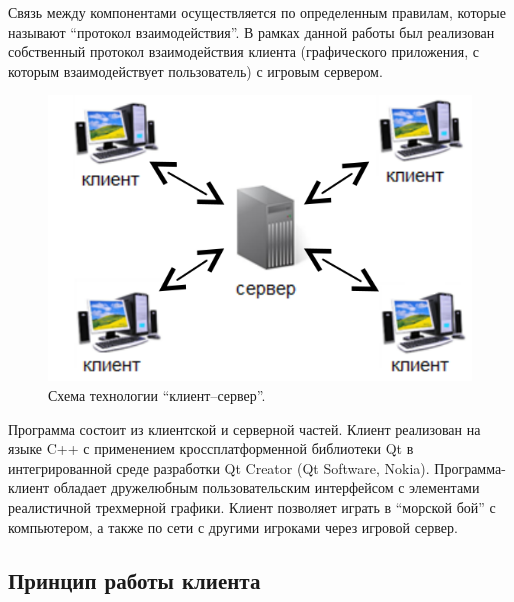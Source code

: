 \documentclass[12pt, a4paper, oneside]{article}
\begin{document}
Связь между компонентами осуществляется по определенным правилам, которые называют ``протокол взаимодействия''. В рамках данной работы был реализован собственный протокол взаимодействия клиента (графического приложения, с которым взаимодействует пользователь) с игровым сервером.

\begin{figure}[t]
\begin{center}
	\includegraphics[scale=0.5]{serverclient.png}
	\caption{Схема технологии ``клиент--сервер''.}
	\label{fig:serverclient}
	\vspace{-0.5cm}
\end{center}
\end{figure}

Программа состоит из клиентской и серверной частей. Клиент реализован на языке C++ с применением кроссплатформенной библиотеки Qt в интегрированной среде разработки Qt Creator (Qt Software\texttrademark, Nokia\texttrademark). Программа-клиент обладает дружелюбным пользовательским интерфейсом с 
элементами реалистичной трехмерной графики. Клиент позволяет играть в ``морской бой'' с компьютером, а также по сети с другими игроками через игровой сервер. 

\subsection{Принцип работы клиента}
\end{document}
